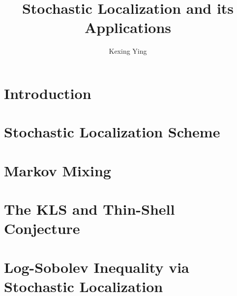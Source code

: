 \documentclass[]{article}
\title{Stochastic Localization and its Applications}
\author{Kexing Ying}
\theoremstyle{definition}
\begin{document}
\maketitle
\thispagestyle{empty}

\newpage
\tableofcontents
\thispagestyle{empty}

\newpage
\section{Introduction}
\label{sec:introduction}


\newpage
\section{Stochastic Localization Scheme}
\label{sec:stoch_loc}


\newpage
\section{Markov Mixing}
\label{sec:mixing}


\newpage
\section{The KLS and Thin-Shell Conjecture}
\label{sec:KLS}



\newpage
\section{Log-Sobolev Inequality via Stochastic Localization}
\label{sec:log-Sobolev}


\newpage


\end{document}
